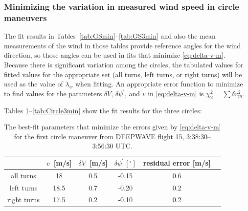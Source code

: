 \documentclass[12pt,twoside,english]{article}\usepackage[]{graphicx}\usepackage[]{color}
\providecommand{\tabularnewline}{\\}
\let\OrgIndex\index
\renewcommand*{\index}[1]{\OrgIndex{#1}}
\begin{document}
{{\begin{center}
\par\end{center}



\subsubsection{Minimizing the variation in measured wind speed in circle maneuvers\label{WS-var-circles}}

The fit results in Tables~\ref{tab:GSmin}--\ref{tab:GS3min} and also the mean measurements of the wind in those tables provide reference angles for the wind direction, so those angles can be used in fits that minimize \eqref{eq:delta-v-m}. Because there is significant variation among the circles, the tabulated values for fitted values for the appropriate set (all turns, left turns, or right turns) will be used as the value of $\lambda_w$ when fitting. An appropriate error function to minimize to find values for the parameters $\delta V$, $\delta\psi^{\prime}$, and $v$ in \eqref{eq:delta-v-m} is $\chi_{2}^{2}=\sum{\delta v_{m}^{2}}$. 

Tables \ref{tab:Circlemin}--\ref{tab:Circle3min} show the fit results for the three circles: 

\begin{center}
\begin{table}[H] 
\begin{centering}
\begin{tabular}{cccccc}
\toprule   & $v$~{[}m/s{]}  & $\delta V$~{[}m/s{]}  & $\delta\psi^{\prime}\,[^{\circ}]$  & residual error {[}m/s{]} & \tabularnewline 
\midrule 
\midrule  all turns  & 18 & 0.5 & -0.15 & 0.6\tabularnewline 
\midrule  left turns & 18.5 & 0.7 & -0.20 & 0.2\tabularnewline 
\midrule  right turns &  17.5 & 0.2 & -0.10 & 0.2\tabularnewline 
\bottomrule 
\end{tabular}
\par\end{centering}

\protect\caption{The best-fit parameters that minimize the errors given by \eqref{eq:delta-v-m} for the first circle maneuver from DEEPWAVE flight 15, 3:38:30--3:56:30 UTC.\label{tab:Circlemin}}
\end{table}

\par\end{center}



}}
\end{document}
